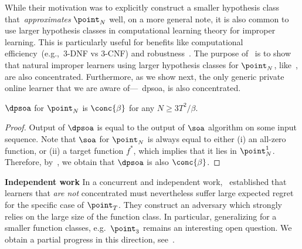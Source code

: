 While their motivation was to explicitly construct a smaller hypothesis class that~\emph{approximates} \(\point_N\) well, on a more general note, it is also common to use larger hypothesis classes in computational learning theory for improper learning. This is particularly useful for benefits like computational efficiency~(e.g.,~3-DNF vs 3-CNF) and robustness~\citep{diakonikolas2019distribution}. The purpose of~ is to show that natural improper learners using larger hypothesis classes for \(\point_N\), like~, are also \(\mathrm{concentrated}\). Furthermore, as we show next, the only generic private online learner that we are aware of---~\Gls{dpsoa}, is also concentrated.
\begin{corollary}\label{lem:dpsoa-conc}
    \(\dpsoa\) for \(\point_N\) is \(\conc{\beta}\) for any \(N \geq 3 T^2 / \beta\).
\end{corollary}
\begin{proof}
    Output of \(\dpsoa\) is equal to the output of \(\soa\) algorithm on some input sequence. 
    Note that \(\soa\) for \(\point_N\) is always equal to either (i) an all-zero function, or (ii) a target function \(f^{\ast}\),
    which implies that it lies in \(\point^1_N\).
    Therefore, by~, we obtain that \(\dpsoa\) is also \(\conc{\beta}\).
\end{proof}


\noindent\textbf{Independent work} In a concurrent and independent work,~\citet{cohen2024lower} established that learners that \emph{are not} concentrated must nevertheless suffer large expected regret for the specific case of \(\point_T\). They construct an adversary which strongly relies on the large size of the function class. In particular, generalizing for a smaller function classes, e.g.~\(\point_3\) remains an interesting open question. We obtain a partial progress in this direction, see~.

